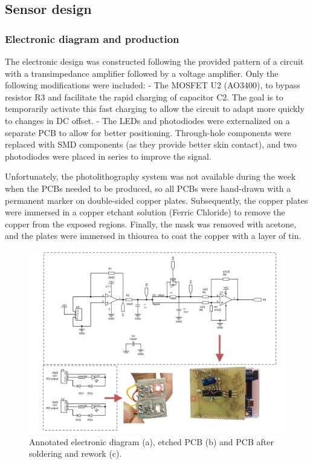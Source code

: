 \documentclass[conference]{IEEEtran}
\begin{document}
   \subsection{Sensor design}
      \subsubsection{Electronic diagram and production}
      The electronic design was constructed following the provided pattern of a circuit with a transimpedance amplifier followed by a voltage amplifier.
      Only the following modifications were included:
         - The MOSFET U2 (AO3400), to bypass resistor R3 and facilitate the rapid charging of capacitor C2. The goal is to temporarily activate this fast charging to allow the circuit to adapt
         more quickly to changes in DC offset.
         - The LEDs and photodiodes were externalized on a separate PCB to allow for better positioning. Through-hole components were replaced with SMD components (as they provide better skin contact),
         and two photodiodes were placed in series to improve the signal.

      Unfortunately, the photolithography system was not available during the week when the PCBs needed to be produced, so all PCBs were hand-drawn with a permanent marker on double-sided copper plates.
      Subsequently, the copper plates were immersed in a copper etchant solution (Ferric Chloride) to remove the copper from the exposed regions. Finally, the mask was removed with acetone, and the plates were immersed in thiourea to coat the copper with a layer of tin.

      \begin{figure}[!th]
         \centering
         \includegraphics[width=\textwidth]{images/ed2.png}
         \caption{Annotated electronic diagram (a), etched PCB (b) and PCB after soldering and rework (c).}
         \label{fig:circuit}
      \end{figure}
\end{document}
